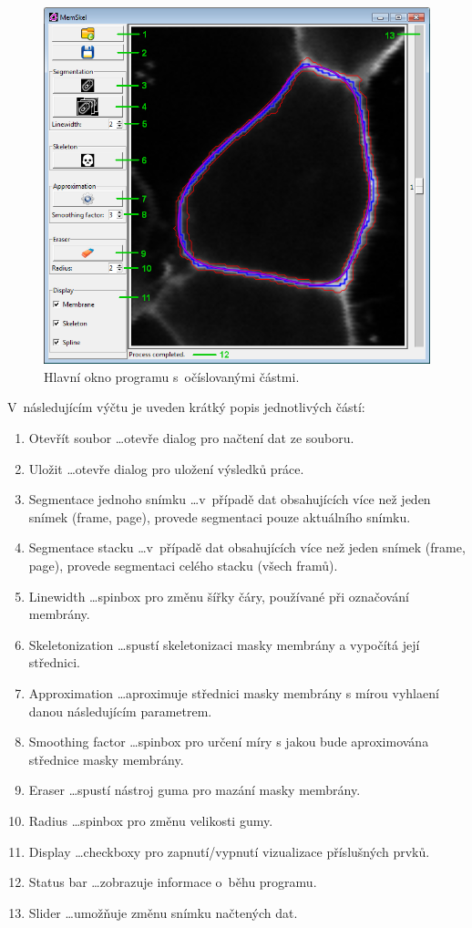 \begin{figure}[htb]
    \centering
    \includegraphics[width = .7\textwidth]{gui_labeled.png}
    \caption{Hlavní okno programu s~očíslovanými částmi.}
    \label{fig:gui_labeled}
\end{figure}

V~následujícím výčtu je uveden krátký popis jednotlivých částí:
\begin{enumerate}
    \item Otevřít soubor \ldots otevře dialog pro načtení dat ze souboru.
	\item Uložit \ldots otevře dialog pro uložení výsledků práce.
	\item Segmentace jednoho snímku \ldots v~případě dat obsahujících více než jeden snímek (frame, page), provede segmentaci pouze aktuálního snímku.
	\item Segmentace stacku \ldots v~případě dat obsahujících více než jeden snímek (frame, page), provede segmentaci celého stacku (všech framů).
	\item Linewidth \ldots spinbox pro změnu šířky čáry, používané při označování membrány.
	\item Skeletonization \ldots spustí skeletonizaci masky membrány a vypočítá její střednici.
	\item Approximation \ldots aproximuje střednici masky membrány s mírou vyhlaení danou následujícím parametrem.
	\item Smoothing factor \ldots spinbox pro určení míry s jakou bude aproximována střednice masky membrány.
	\item Eraser \ldots spustí nástroj guma pro mazání masky membrány.
	\item Radius \ldots spinbox pro změnu velikosti gumy.
	\item Display \ldots checkboxy pro zapnutí/vypnutí vizualizace příslušných prvků.
	\item Status bar \ldots zobrazuje informace o~běhu programu.
	\item Slider \ldots umožňuje změnu snímku načtených dat.
\end{enumerate}


